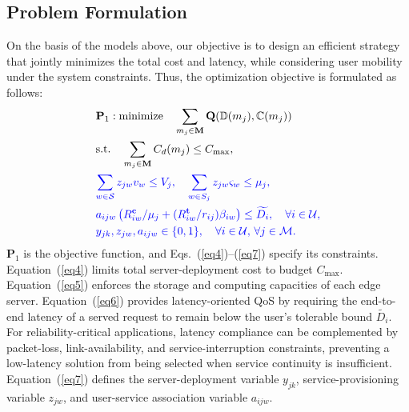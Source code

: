 \documentclass[10pt, conference, letterpaper]{IEEEtran}
\newenvironment{revision}{\begingroup\color{blue}}{\endgroup}
\newcommand{\rev}[1]{\textcolor{blue}{#1}}
\newenvironment{revision}{\begingroup}{\endgroup}
\newcommand{\rev}[1]{#1}
\begin{document}
\subsection{Problem Formulation}
On the basis of the models above, our objective is to design an efficient strategy that jointly minimizes the total cost and latency, while considering user mobility under the system constraints. Thus, the optimization objective is formulated as follows: 
\begin{align}
	&\textbf{P}_1:\text{minimize} \quad \sum_{m_j\in \textbf{M}}\textbf{Q}(\mathbb{D}(m_j), \mathbb{C}(m_j))\label{eq3}\\
&\text{s.t.} \quad \sum_{m_j\in \textbf{M}} C_{d}(m_j) \leq C_{\max},\label{eq4}\\
& \rev{\sum_{w \in \mathcal{S}} z_{jw}v_w \leq V_j, \quad \sum_{w \in S_j} z_{jw}\varsigma_w \leq \mu_j,} \,\label{eq5} \\
& \rev{a_{ijw}\left({R^{\textbf{c}}_{iw}}/{\mu_j} + ({R^{\textbf{t}}_{iw}}/{r_{ij}})\beta_{iw}\right) \leq \widetilde{D_i}, \quad \forall i \in \mathcal{U},} \label{eq6} \\
& \rev{y_{jk}, z_{jw}, a_{ijw} \in \{0,1\}, \quad \forall i \in \mathcal{U}, \, \forall j \in \mathcal{M}.}\label{eq7}
\end{align}  
\begin{revision}
$\textbf{P}_1$ is the objective function, and Eqs.~(\ref{eq4})--(\ref{eq7}) specify its constraints. Equation~(\ref{eq4}) limits total server-deployment cost to budget $C_{\max}$. Equation~(\ref{eq5}) enforces the storage and computing capacities of each edge server. Equation~(\ref{eq6}) provides latency-oriented QoS by requiring the end-to-end latency of a served request to remain below the user's tolerable bound $\widetilde{D_i}$. For reliability-critical applications, latency compliance can be complemented by packet-loss, link-availability, and service-interruption constraints, preventing a low-latency solution from being selected when service continuity is insufficient. Equation~(\ref{eq7}) defines the server-deployment variable $y_{jk}$, service-provisioning variable $z_{jw}$, and user-service association variable $a_{ijw}$.
\end{revision}
\end{document}
